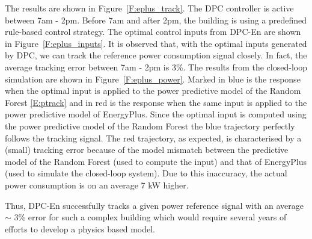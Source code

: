 The results are shown in Figure~\ref{F:eplus_track}. 
The DPC controller is active between 7am - 2pm. Before 7am and after 2pm, the building is using a predefined rule-based control strategy.
The optimal control inputs from DPC-En are shown in Figure~\ref{F:eplus_inputs}. It is observed that, with the optimal inputs generated by DPC, we can track the reference power consumption signal closely. In fact, the average tracking error between 7am - 2pm is 3\%.
\textcolor[rgb]{0,0,1}{The results from the closed-loop simulation are shown in Figure~\ref{F:eplus_power}.
Marked in blue is the response when the optimal input is applied to the power predictive model of the Random Forest \eqref{E:ptrack} and in red is the response when the same input is applied to the power predictive model of EnergyPlus. Since the optimal input is computed using the power predictive model of the Random Forest the blue trajectory perfectly follows the tracking signal. The red trajectory, as expected, is characterised by a (small) tracking error because of the model mismatch between the predictive model of the Random Forest (used to compute the input) and that of EnergyPlus (used to simulate the closed-loop system).} 
Due to this inaccuracy, the actual power consumption is on an average 7 kW higher.

Thus, DPC-En successfully tracks a given power reference signal with an average $\sim$ 3\% error for such a complex building which would require several years of efforts to develop a physics based model.

